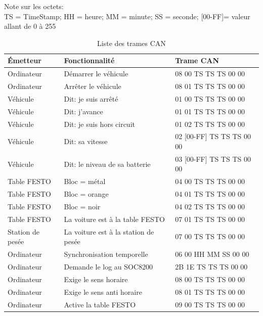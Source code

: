 \documentclass[10pt,a4paper,final]{article}
\begin{document}
\begin{spacing}{1.5}
\begin{center}
Note sur les octets:\\
TS = TimeStamp; HH = heure; MM = minute; SS = seconde; [00-FF]= valeur allant de 0 à 255
\end{center}


\begin{table}[!ht]
\caption{Liste des trames CAN}
\medskip
\centering
\begin{tabular}{|l|l|l|}
\hline 
\textbf{Émetteur} & \textbf{Fonctionnalité} & \textbf{Trame CAN}  \\ 
\hline 
Ordinateur & Démarrer le véhicule & 08 00 TS TS TS 00 00  \\ 
\hline 
Ordinateur & Arrêter le véhicule & 08 01 TS TS TS 00 00  \\ 
\hline 
Véhicule & Dit: je suis arrêté & 01 00 TS TS TS 00 00  \\ 
\hline 
Véhicule & Dit: j'avance & 01 01 TS TS TS 00 00 \\ 
\hline 
Véhicule & Dit: je suis hors circuit & 01 02 TS TS TS 00 00  \\ 
\hline 
Véhicule & Dit: sa vitesse & 02 [00-FF] TS TS TS 00 00 \\ 
\hline 
Véhicule & Dit: le niveau de sa batterie & 03 [00-FF] TS TS TS 00 00 \\ 
\hline 
Table FESTO & Bloc = métal & 04 00 TS TS TS 00 00  \\ 
\hline 
Table FESTO & Bloc = orange & 04 01 TS TS TS 00 00  \\ 
\hline 
Table FESTO & Bloc = noir & 04 02 TS TS TS 00 00  \\ 
\hline 
Table FESTO & La voiture est à la table FESTO & 07 01 TS TS TS 00 00 \\ 
\hline 
Station de pesée & La voiture est à la station de pesée & 07 00 TS TS TS 00 00  \\ 
\hline 
Ordinateur & Synchronisation temporelle & 06 00 HH MM SS 00 00  \\ 
\hline 
Ordinateur & Demande le log au SOC8200 & 2B 1E TS TS TS 00 00  \\ 
\hline 
Ordinateur & Exige le sens horaire & 08 00 TS TS TS 00 00  \\ 
\hline 
Ordinateur & Exige le sens anti horaire & 08 01 TS TS TS 00 00  \\ 
\hline 
Ordinateur & Active la table FESTO & 09 00 TS TS TS 00 00  \\ 
\hline 
\end{tabular} 
\label{tab:testtab2}
\end{table} 


\end{spacing}
\end{document}
